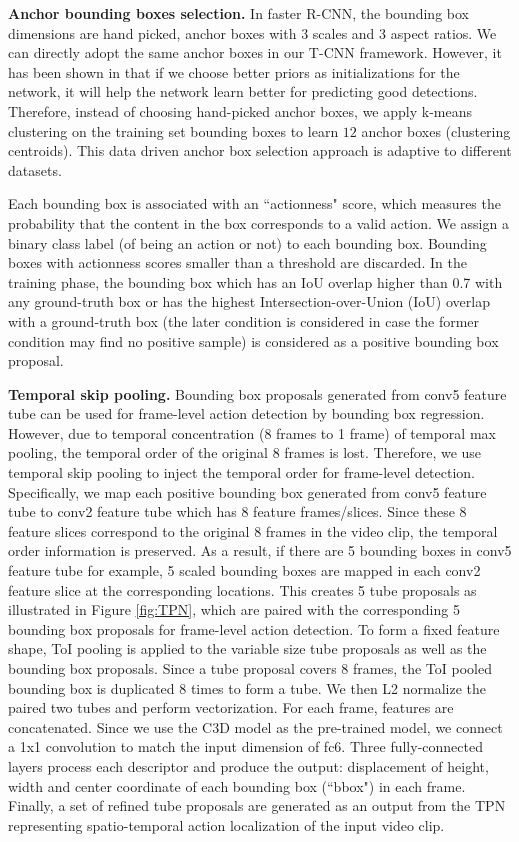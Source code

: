 \documentclass[10pt,twocolumn,letterpaper]{article}
\begin{document}
\textbf{Anchor bounding boxes selection.} In faster R-CNN, the bounding box dimensions are hand picked,  anchor boxes with 3 scales and 3 aspect ratios. We can directly adopt the same anchor boxes in our T-CNN framework. However, it has been shown in \cite{yolo9000} that if we choose better priors as initializations for the network, it will help the network learn better for predicting good detections.
Therefore, instead of choosing hand-picked anchor boxes, we apply k-means
clustering on the training set bounding boxes to learn $12$ anchor boxes (\ie clustering centroids). This data driven anchor box selection approach is adaptive to different datasets.


Each bounding box is associated with an ``actionness" score, which measures the probability that the content in the box corresponds to a valid action. We assign a binary class label (of being an action or not) to each bounding box. Bounding boxes with actionness scores smaller than a threshold are discarded. In the training phase, the bounding box which has an IoU overlap higher than 0.7 with any ground-truth box or has the highest Intersection-over-Union (IoU) overlap with a ground-truth box (the later condition is considered in case the former condition may find no positive sample) is considered as a positive bounding box proposal.



\textbf{Temporal skip pooling.} Bounding box proposals generated from conv5 feature tube can be used for frame-level action detection by bounding box regression. However, due to temporal concentration (8 frames to 1 frame) of temporal max pooling, the temporal order  of the original 8 frames is lost. Therefore, we use temporal skip pooling to inject the temporal order  for frame-level detection. Specifically, we map each positive bounding box generated from conv5 feature tube to conv2 feature tube which has 8 feature frames/slices. Since these 8 feature slices correspond to the original 8 frames in the video clip, the temporal order information is preserved. As a result, if there are 5 bounding boxes in conv5 feature tube for example, 5 scaled bounding boxes are mapped in each conv2 feature slice at the corresponding locations. This creates 5 tube proposals as illustrated in Figure \ref{fig:TPN}, which are paired with the corresponding 5 bounding box proposals for frame-level action detection. To form a fixed feature shape, ToI pooling is applied to the variable size tube proposals as well as the bounding box proposals. Since a tube proposal covers 8 frames, the ToI pooled bounding box is duplicated 8 times to form a tube. We then L2 normalize the paired two tubes and perform vectorization. For each frame, features are concatenated.
Since we use the C3D model \cite{c3d} as the pre-trained model, we connect a 1x1 convolution to match the input dimension of fc6.
Three fully-connected layers process each descriptor and produce the output: displacement of height, width and center coordinate of each bounding box (``bbox") in each frame. Finally, a set of refined tube proposals are generated as an output from the TPN representing spatio-temporal action localization of the input video clip.
\end{document}
